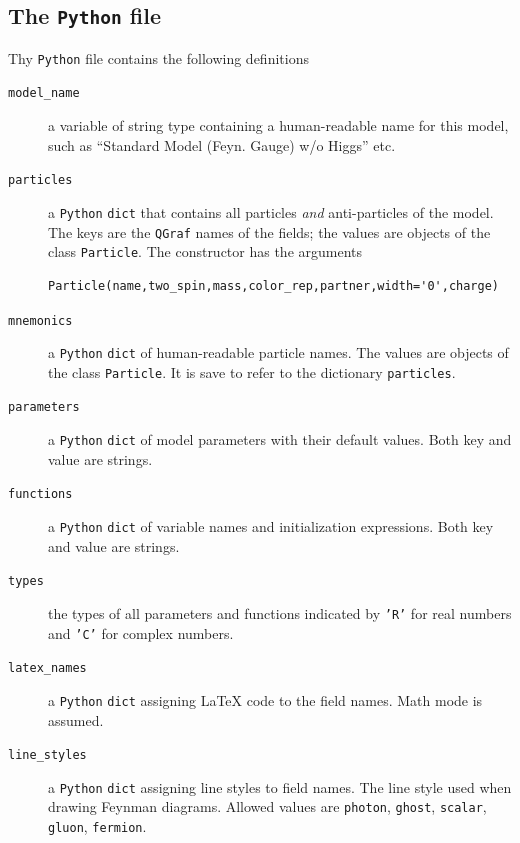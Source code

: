 \documentclass[11pt,a4paper]{refrep}
\newcommand{\qgraf}{{\tt QGraf}\xspace}
\newcommand{\python}{{\tt Python}\xspace}
\begin{document}
\subsection{The \python{} file}
Thy \python{} file contains the following definitions
\begin{description}
\item[\texttt{model\_name}] a variable of string type containing a human-readable
     name for this model, such as ``Standard Model (Feyn. Gauge) w/o Higgs'' etc.
\item[\texttt{particles}] a \python{} \texttt{dict} that contains all particles
     \emph{and} anti-particles of the model. The keys are the \qgraf{} names of the
     fields; the values are objects of the class \texttt{Particle}.
     The constructor has the arguments
     \begin{verbatim}
Particle(name,two_spin,mass,color_rep,partner,width='0',charge)
     \end{verbatim}
\item[\texttt{mnemonics}] a \python{} \texttt{dict} of
     human-readable particle names. The values are objects of the class
     \texttt{Particle}. It is save to refer to the dictionary \texttt{particles}.
\item[\texttt{parameters}] a \python{} \texttt{dict} of
     model parameters with their default values. Both key and value are strings.
\item[\texttt{functions}] a \python{} \texttt{dict} of
     variable names and initialization expressions. Both key and value are strings.
\item[\texttt{types}] the types of all parameters and functions indicated by
     \texttt{'R'} for real numbers and \texttt{'C'} for complex numbers.
\item[\texttt{latex\_names}] a \python{} \texttt{dict} assigning \LaTeX{}
     code to the field names. Math mode is assumed.
\item[\texttt{line\_styles}] a \python{} \texttt{dict} assigning line styles
     to field names. The line style used when drawing Feynman diagrams.
     Allowed values are \texttt{photon}, \texttt{ghost}, \texttt{scalar},
     \texttt{gluon}, \texttt{fermion}.
\end{description}
\end{document}
